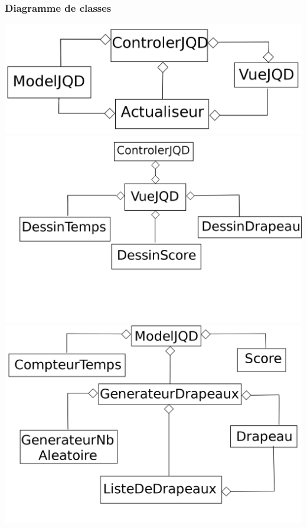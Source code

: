 \documentclass{article}
\begin{document}
\subsubsection{Diagramme de classes}
\begin{center}
	\includegraphics[scale=0.25]{diagClasse1.png}\\
	\includegraphics[scale=0.3]{diagClasse2.png}\\
	\includegraphics[scale=0.25]{diagClasse3.png}
\end{center}
\end{document}
